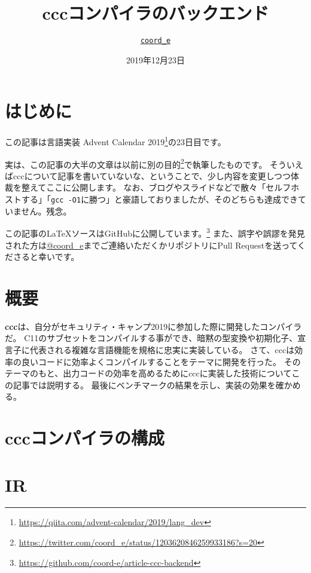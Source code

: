 \documentclass[uplatex,a4paper]{jsarticle}
\title{cccコンパイラのバックエンド}
\author{\href{https://keybase.io/coorde}{\texttt{coord\_e}}}
\date{2019年12月23日}
\begin{document}
\maketitle

\setcounter{page}{1}

\section{はじめに}

この記事は言語実装 Advent Calendar 2019\footnote{\url{https://qiita.com/advent-calendar/2019/lang_dev}}の23日目です。

実は、この記事の大半の文章は以前に別の目的\footnote{\url{https://twitter.com/coord_e/status/1203620846259933186?s=20}}で執筆したものです。
そういえばcccについて記事を書いていないな、ということで、少し内容を変更しつつ体裁を整えてここに公開します。
なお、ブログやスライドなどで散々「セルフホストする」「\texttt{gcc -O1}に勝つ」と豪語しておりましたが、そのどちらも達成できていません。残念。

この記事の\LaTeX ソースはGitHubに公開しています。\footnote{\url{https://github.com/coord-e/article-ccc-backend}}
また、誤字や誤謬を発見された方は\href{https://twitter.com/coord_e}{@coord\_e}までご連絡いただくかリポジトリにPull Requestを送ってくださると幸いです。

\section {概要}
\label{ccc_abstract}

\textbf{ccc}は、自分がセキュリティ・キャンプ2019\cite{seccamp19}に参加した際に開発したコンパイラだ。
C11のサブセットをコンパイルする事ができ、暗黙の型変換や初期化子、宣言子に代表される複雑な言語機能を規格に忠実に実装している。
さて、cccは効率の良いコードに効率よくコンパイルすることをテーマに開発を行った。
そのテーマのもと、出力コードの効率を高めるためにcccに実装した技術についてこの記事では説明する。
最後にベンチマークの結果を示し、実装の効果を確かめる。

\section{cccコンパイラの構成}


\clearpage
\section{IR}
\label{ccc_ir}

\end{document}
